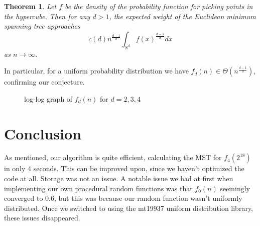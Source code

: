 \documentclass[a4paper, 10pt, twocolumn, twoside]{article}
\newtheorem{theorem}{Theorem}
\begin{document}
\begin{theorem}
    Let $f$ be the density of the probability function for picking points in the hypercube. Then for any $d>1$, the expected weight of the Euclidean minimum spanning tree approaches 
    \[
        c(d)n^{\frac{d-1}{d}}\int_{\mathbb{R}^d}f(x)^{\frac{d-1}{d}}dx
    \] 
    as $n\to \infty$. 
\end{theorem}

In particular, for a uniform probability distribution we have $f_d(n)\in \Theta(n^{\frac{d-1}{d}})$, confirming our conjecture.



\begin{figure}[htbp]
        \caption{log-log graph of $f_d(n)$ for $d=2,3,4$}
    \label{fig}
\end{figure}

\section{Conclusion}
\label{sec:Conclusion}

As mentioned, our algorithm is quite efficient, calculating the MST for $f_4(2^{18})$ in only $4$ seconds. This can be improved upon, since we haven't optimized the code at all. Storage was not an issue. A notable issue we had at first when implementing our own procedural random functions was that $f_0(n)$ seemingly converged to $0.6$, but this was because our random function wasn't uniformly distributed. Once we switched to using the mt19937 uniform distribution library, these issues disappeared.


\end{document}
